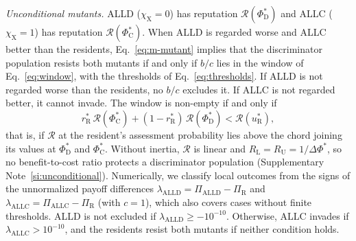 \documentclass[10pt]{wlscirep}
\newcommand{\Rmap}{\mathscr{R}}            %
\newcommand{\rR}{r_{\mathrm{R}}^{*}}
\newcommand{\uR}{u_{\mathrm{R}}^{*}}
\newcommand{\PhiCs}{\Phi^{*}_{\mathrm{C}}}
\newcommand{\PhiDs}{\Phi^{*}_{\mathrm{D}}}
\newcommand{\dPhi}{\Delta\Phi^{*}}
\newcommand{\ALLC}{\mathrm{ALLC}}
\newcommand{\ALLD}{\mathrm{ALLD}}
\theoremstyle{plain}
\theoremstyle{remark}
\begin{document}
\textit{Unconditional mutants.} ALLD ($\chi_{\mathrm X}=0$) has reputation $\Rmap(\PhiDs)$ and ALLC ($\chi_{\mathrm X}=1$) has reputation $\Rmap(\PhiCs)$. When ALLD is regarded worse and ALLC better than the residents, Eq.~\eqref{eq:m-mutant} implies that the discriminator population resists both mutants if and only if $b/c$ lies in the window of Eq.~\eqref{eq:window}, with the thresholds of Eq.~\eqref{eq:thresholds}. If ALLD is not regarded worse than the residents, no $b/c$ excludes it. If ALLC is not regarded better, it cannot invade. The window is non-empty if and only if
\begin{equation}
\rR\,\Rmap(\PhiCs)+(1-\rR)\,\Rmap(\PhiDs)<\Rmap(\uR),
\label{eq:m-chord}
\end{equation}
that is, if $\Rmap$ at the resident's assessment probability lies above the chord joining its values at $\PhiDs$ and $\PhiCs$. Without inertia, $\Rmap$ is linear and $R_{\mathrm L}=R_{\mathrm U}=1/\dPhi$, so no benefit-to-cost ratio protects a discriminator population (Supplementary Note~\ref{si:unconditional}). Numerically, we classify local outcomes from the signs of the unnormalized payoff differences $\lambda_{\ALLD}=\Pi_{\ALLD}-\Pi_{\mathrm R}$ and $\lambda_{\ALLC}=\Pi_{\ALLC}-\Pi_{\mathrm R}$ (with $c=1$), which also covers cases without finite thresholds. ALLD is not excluded if $\lambda_{\ALLD}\geq-10^{-10}$. Otherwise, ALLC invades if $\lambda_{\ALLC}>10^{-10}$, and the residents resist both mutants if neither condition holds.
\end{document}
